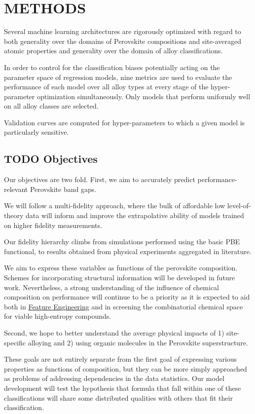 \documentclass[aip, jmp, amsmath, amssymb]{revtex4-2}
\begin{document}
\section*{METHODS}
\label{sec:org9b441ac}
Several machine learning architectures are rigorously optimized with
regard to both generality over the domains of Perovskite compositions
and site-averaged atomic properties and generality over the domain of
alloy classifications.

In order to control for the classification biases potentially acting
on the parameter space of regression models, nine metrics are used to
evaluate the performance of each model over all alloy types at every
stage of the hyper-parameter optimization simultaneously. Only models
that perform uniformly well on all alloy classes are selected.

Validation curves are computed for hyper-parameters to which a given
model is particularly sensitive.

\subsection*{{\bfseries\sffamily TODO} Objectives}
\label{sec:org5569567}
Our objectives are two fold. First, we aim to accurately predict
performance-relevant Perovskite band gaps.

We will follow a multi-fidelity approach, where the bulk of affordable
low level-of-theory data will inform and improve the extrapolative
ability of models trained on higher fidelity measurements.

Our fidelity hierarchy climbs from simulations performed using the
basic PBE functional, to results obtained from physical experiments
aggregated in literature\cite{almora-2020-devic-perfor}.

We aim to express these variables as functions of the perovskite
composition. Schemes for incorporating structural information will be
developed in future work. Nevertheless, a strong understanding of the
influence of chemical composition on performance will continue to be a
priority as it is expected to aid both in \hyperref[sec:orgdace41d]{Feature Engineering} and in
screening the combinatorial chemical space for viable high-entropy
compounds.

Second, we hope to better understand the average physical impacts
of 1) site-specific alloying and 2) using organic molecules in the
Perovskite superstructure.

These goals are not entirely separate from the first goal of
expressing various properties as functions of composition, but they
can be more simply approached as problems of addressing dependencies
in the data statistics. Our model development will test the hypothesis
that formula that fall within one of these classifications will share
some distributed qualities with others that fit their classification.
\end{document}
